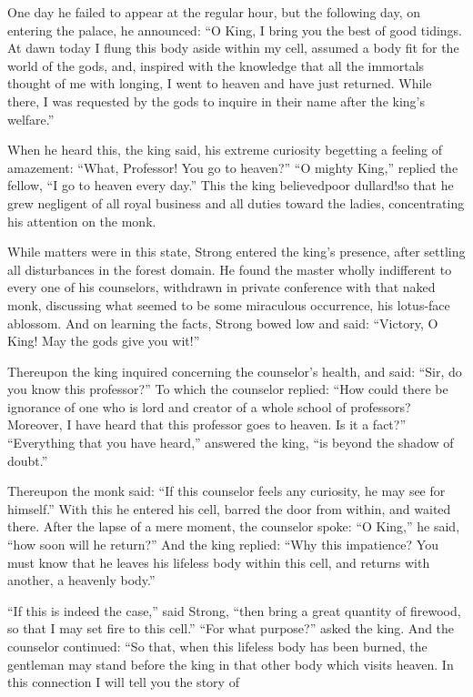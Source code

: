 \documentclass[article, twoside, 14pt]{memoir}
\begin{document}
One day he failed to appear at the regular hour, but the following
day, on entering the palace, he announced:
``O King, I bring you the best of good tidings. At dawn today I flung this body aside within my cell, assumed a body fit for the world of the gods, and, inspired with the knowledge that all the immortals thought of me with longing, I went to heaven and have just returned. While there, I was requested by the gods to inquire in their name after the king's welfare.''

When he heard this, the king said, his extreme curiosity begetting
a feeling of amazement: ``What, Professor! You go to heaven?''
``O mighty King,'' replied the fellow,
``I go to heaven every day.'' This the king believed{\textemdash}poor
dullard!{\textemdash}so that he grew negligent of all royal business and all
duties toward the ladies, concentrating his attention on the monk.

While matters were in this state, Strong entered the king's
presence, after settling all disturbances in the forest
domain. He found the master wholly indifferent to every one of his
counselors, withdrawn in private conference with that naked monk,
discussing what seemed to be some miraculous occurrence, his
lotus-face ablossom. And on learning the facts, Strong bowed low
and said: ``Victory, O King! May the gods give you wit!''

Thereupon the king inquired concerning the counselor's health, and
said: ``Sir, do you know this professor?'' To which the counselor
replied:
``How could there be ignorance of one who is lord and creator of a whole school of professors? Moreover, I have heard that this professor goes to heaven. Is it a fact?''
``Everything that you have heard,'' answered the king,
``is beyond the shadow of doubt.''

Thereupon the monk said:
``If this counselor feels any curiosity, he may see for himself.''
With this he entered his cell, barred the door from within, and
waited there. After the lapse of a mere moment, the counselor
spoke: ``O King,'' he said, ``how soon will he return?'' And the
king replied:
``Why this impatience? You must know that he leaves his lifeless body within this cell, and returns with another, a heavenly body.''

``If this is indeed the case,'' said Strong,
``then bring a great quantity of firewood, so that I may set fire to this cell.''
``For what purpose?'' asked the king. And the counselor continued:
“So that, when this lifeless body has been burned, the gentleman
may stand before the king in that other body which visits heaven.
In this connection I will tell you the story of
\end{document}
